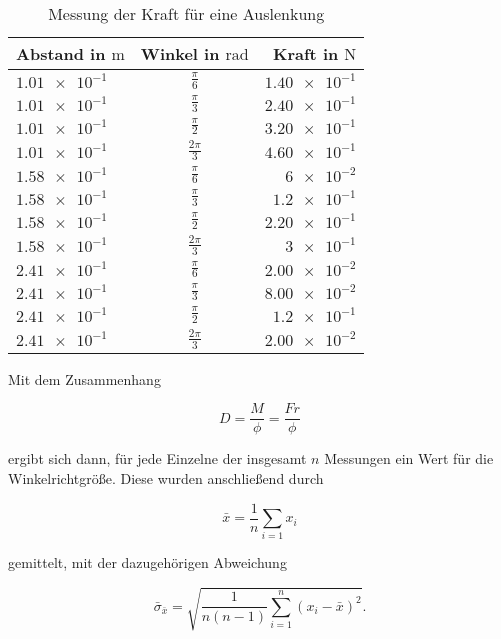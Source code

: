 \begin{table}
\centering
\caption{Messung der Kraft für eine Auslenkung}
\label{tab: winkelricht}
\renewcommand{\arraystretch}{1.2}
\begin{tabular}{lcr}
	\toprule
	Abstand in $\si{\meter}$ & Winkel in $\mathrm{rad}$ & Kraft in $\si{\newton}$ \\
	\midrule
	$\num{1.01e-1}$ & $\frac{\pi}{6}$ & $\num{1.40e-1}$ \\
	$\num{1.01e-1}$ & $\frac{\pi}{3}$ & $\num{2.40e-1}$ \\
	$\num{1.01e-1}$ & $\frac{\pi}{2}$ & $\num{3.20e-1}$ \\
	$\num{1.01e-1}$ & $\frac{2\pi}{3}$ & $\num{4.60e-1}$ \\
	$\num{1.58e-1}$ & $\frac{\pi}{6}$ & $\num{6e-2}$ \\
	$\num{1.58e-1}$ & $\frac{\pi}{3}$ & $\num{1.2e-1}$ \\
	$\num{1.58e-1}$ & $\frac{\pi}{2}$ & $\num{2.20e-1}$ \\
	$\num{1.58e-1}$ & $\frac{2\pi}{3}$ & $\num{3e-1}$ \\
	$\num{2.41e-1}$ & $\frac{\pi}{6}$ & $\num{2.00e-2}$ \\
	$\num{2.41e-1}$ & $\frac{\pi}{3}$ & $\num{8.00e-2}$ \\
	$\num{2.41e-1}$ & $\frac{\pi}{2}$ & $\num{1.2e-1}$ \\
	$\num{2.41e-1}$ & $\frac{2\pi}{3}$ & $\num{2.00e-2}$ \\
	\bottomrule
\end{tabular}
\end{table}

Mit dem Zusammenhang

\begin{equation*}
D=\frac{M}{\phi}=\frac{Fr}{\phi}
\end{equation*}

ergibt sich dann, für jede Einzelne der insgesamt $n$ Messungen ein Wert für die Winkelrichtgröße.
Diese wurden anschließend durch

\begin{equation}
\label{eq:mittel}
\bar{x}=\frac{1}{n}\sum_{i=1}x_i
\end{equation}

gemittelt, mit der dazugehörigen Abweichung

\begin{equation}
\label{eq:stand_ab}
\bar{\sigma}_{\bar{x}}=\sqrt{\frac{1}{n(n-1)}\sum_{i=1}^{n}(x_i-\bar{x})^2}.
\end{equation}

